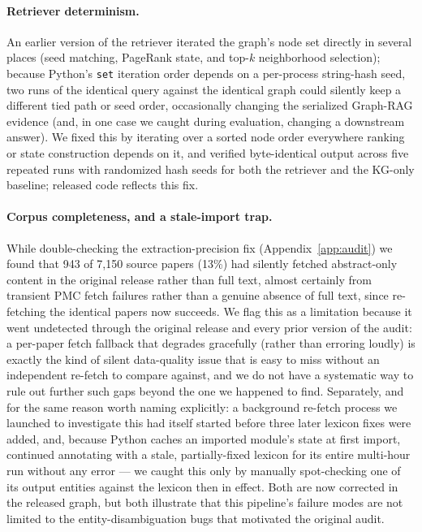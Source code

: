 \documentclass{article}
\begin{document}
\paragraph{Retriever determinism.} An earlier version of the retriever iterated the graph's node set directly in several places (seed matching, PageRank state, and top-$k$ neighborhood selection); because Python's \texttt{set} iteration order depends on a per-process string-hash seed, two runs of the identical query against the identical graph could silently keep a different tied path or seed order, occasionally changing the serialized Graph-RAG evidence (and, in one case we caught during evaluation, changing a downstream answer). We fixed this by iterating over a sorted node order everywhere ranking or state construction depends on it, and verified byte-identical output across five repeated runs with randomized hash seeds for both the retriever and the KG-only baseline; released code reflects this fix.
\paragraph{Corpus completeness, and a stale-import trap.} While double-checking the extraction-precision fix (Appendix~\ref{app:audit}) we found that 943 of 7{,}150 source papers (13\%) had silently fetched abstract-only content in the original release rather than full text, almost certainly from transient PMC fetch failures rather than a genuine absence of full text, since re-fetching the identical papers now succeeds. We flag this as a limitation because it went undetected through the original release and every prior version of the audit: a per-paper fetch fallback that degrades gracefully (rather than erroring loudly) is exactly the kind of silent data-quality issue that is easy to miss without an independent re-fetch to compare against, and we do not have a systematic way to rule out further such gaps beyond the one we happened to find. Separately, and for the same reason worth naming explicitly: a background re-fetch process we launched to investigate this had itself started before three later lexicon fixes were added, and, because Python caches an imported module's state at first import, continued annotating with a stale, partially-fixed lexicon for its entire multi-hour run without any error --- we caught this only by manually spot-checking one of its output entities against the lexicon then in effect. Both are now corrected in the released graph, but both illustrate that this pipeline's failure modes are not limited to the entity-disambiguation bugs that motivated the original audit.
\end{document}
